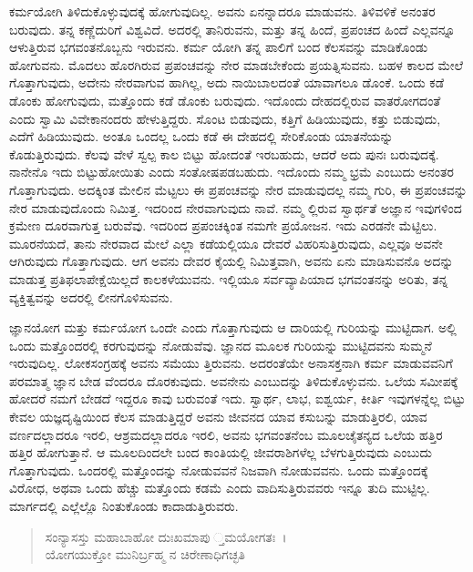 ಕರ್ಮಯೋಗಿ ತಿಳಿದುಕೊಳ್ಳುವುದಕ್ಕೆ ಹೋಗುವುದಿಲ್ಲ. ಅವನು ಏನನ್ನಾದರೂ ಮಾಡುವನು. ತಿಳಿವಳಿಕೆ ಅನಂತರ ಬರುವುದು. ತನ್ನ ಕಣ್ಣೆದುರಿಗೆ ವಿಶ್ವವಿದೆ. ಅದರಲ್ಲಿ ತಾನಿರುವನು, ಮತ್ತು ತನ್ನ ಹಿಂದೆ, ಪ್ರಪಂಚದ ಹಿಂದೆ ಎಲ್ಲವನ್ನೂ ಆಳುತ್ತಿರುವ ಭಗವಂತನೊಬ್ಬನು ಇರುವನು. ಕರ್ಮ ಯೋಗಿ ತನ್ನ ಪಾಲಿಗೆ ಬಂದ ಕೆಲಸವನ್ನು ಮಾಡಿಕೊಂಡು ಹೋಗುವನು. ಮೊದಲು ಹೊರಗಿರುವ ಪ್ರಪಂಚವನ್ನು ನೇರ ಮಾಡಬೇಕೆಂದು ಪ್ರಯತ್ನಿಸುವನು. ಬಹಳ ಕಾಲದ ಮೇಲೆ ಗೊತ್ತಾಗುವುದು, ಅದೇನು ನೇರವಾಗುವ ಹಾಗಿಲ್ಲ, ಅದು ನಾಯಿಬಾಲದಂತೆ ಯಾವಾಗಲೂ ಡೊಂಕೆ. ಒಂದು ಕಡೆ ಡೊಂಕು ಹೋಗುವುದು, ಮತ್ತೊಂದು ಕಡೆ ಡೊಂಕು ಬರುವುದು. ಇದೊಂದು ದೇಹದಲ್ಲಿರುವ ವಾತರೋಗದಂತೆ ಎಂದು ಸ್ವಾಮಿ ವಿವೇಕಾನಂದರು ಹೇಳುತ್ತಿದ್ದರು. ಸೊಂಟ ಬಿಡುವುದು, ಕತ್ತಿಗೆ ಹಿಡಿಯುವುದು, ಕತ್ತು ಬಿಡುವುದು, ಎದೆಗೆ ಹಿಡಿಯುವುದು. ಅಂತೂ ಒಂದಲ್ಲ ಒಂದು ಕಡೆ ಈ ದೇಹದಲ್ಲಿ ಸೇರಿಕೊಂಡು ಯಾತನೆಯನ್ನು ಕೊಡುತ್ತಿರುವುದು. ಕೆಲವು ವೇಳೆ ಸ್ವಲ್ಪ ಕಾಲ ಬಿಟ್ಟು ಹೋದಂತೆ ಇರಬಹುದು, ಆದರೆ ಅದು ಪುನಃ ಬರುವುದಕ್ಕೆ. ನಾನೇನೊ ಇದು ಬಿಟ್ಟುಹೋಯಿತು ಎಂದು ಸಂತೋಷಪಡಬಹುದು. ಇದೊಂದು ನಮ್ಮ ಭ್ರಮೆ ಎಂಬುದು ಅನಂತರ ಗೊತ್ತಾಗುವುದು. ಅದಕ್ಕಿಂತ ಮೇಲಿನ ಮೆಟ್ಟಲು ಈ ಪ್ರಪಂಚವನ್ನು ನೇರ ಮಾಡುವುದಲ್ಲ ನಮ್ಮ ಗುರಿ, ಈ ಪ್ರಪಂಚವನ್ನು ನೇರ ಮಾಡುವುದೊಂದು ನಿಮಿತ್ತ. ಇದರಿಂದ ನೇರವಾಗುವುದು ನಾವೆ. ನಮ್ಮ ಲ್ಲಿರುವ ಸ್ವಾರ್ಥತೆ ಅಜ್ಞಾನ ಇವುಗಳಿಂದ ಕ್ರಮೇಣ ದೂರವಾಗುತ್ತ ಬರುವೆವು. ಇದರಿಂದ ಪ್ರಪಂಚಕ್ಕಿಂತ ನಮಗೇ ಪ್ರಯೋಜನ. ಇದು ಎರಡನೇ ಮೆಟ್ಟಿಲು. ಮೂರನೆಯದೆ, ತಾನು ನೇರವಾದ ಮೇಲೆ ಎಲ್ಲಾ ಕಡೆಯಲ್ಲಿಯೂ ದೇವರೆ ವಿಹರಿಸುತ್ತಿರುವುದು, ಎಲ್ಲವೂ ಅವನೇ ಆಗಿರುವುದು ಗೊತ್ತಾಗುವುದು. ಆಗ ಅವನು ದೇವರ ಕೈಯಲ್ಲಿ ನಿಮಿತ್ತವಾಗಿ, ಅವನು ಏನು ಮಾಡಿಸುವನೊ ಅದನ್ನು ಮಾಡುತ್ತ ಪ್ರತಿಫಲಾಪೇಕ್ಷೆಯಿಲ್ಲದೆ ಕಾಲಕಳೆಯುವನು. ಇಲ್ಲಿಯೂ ಸರ್ವವ್ಯಾಪಿಯಾದ ಭಗವಂತನನ್ನು ಅರಿತು, ತನ್ನ ವ್ಯಕ್ತಿತ್ವವನ್ನು ಅದರಲ್ಲಿ ಲೀನಗೊಳಿಸುವನು.

ಜ್ಞಾನಯೋಗ ಮತ್ತು ಕರ್ಮಯೋಗ ಒಂದೇ ಎಂದು ಗೊತ್ತಾಗುವುದು ಆ ದಾರಿಯಲ್ಲಿ ಗುರಿಯನ್ನು ಮುಟ್ಟಿದಾಗ. ಅಲ್ಲಿ ಒಂದು ಮತ್ತೊಂದರಲ್ಲಿ ಕರಗುವುದನ್ನು ನೋಡುವೆವು. ಜ್ಞಾನದ ಮೂಲಕ ಗುರಿಯನ್ನು ಮುಟ್ಟಿದವನು ಸುಮ್ಮನೆ ಇರುವುದಿಲ್ಲ. ಲೋಕಸಂಗ್ರಹಕ್ಕೆ ಅವನು ಸಮೆಯು ತ್ತಿರುವನು. ಅದರಂತೆಯೇ ಅನಾಸಕ್ತನಾಗಿ ಕರ್ಮ ಮಾಡುವವನಿಗೆ ಪರಮಾತ್ಮ ಜ್ಞಾನ ಬೇಡ ವೆಂದರೂ ದೊರಕುವುದು. ಅವನೇನು ಎಂಬುದನ್ನು ತಿಳಿದುಕೊಳ್ಳುವನು. ಒಲೆಯ ಸಮೀಪಕ್ಕೆ ಹೋದರೆ ನಮಗೆ ಬೇಡದೆ ಇದ್ದರೂ ಕಾವು ಬರುವಂತೆ ಇದು. ಸ್ವಾರ್ಥ, ಲಾಭ, ಐಶ್ವರ್ಯ, ಕೀರ್ತಿ ಇವುಗಳನ್ನೆಲ್ಲ ಬಿಟ್ಟು ಕೇವಲ ಯಜ್ಞದೃಷ್ಟಿಯಿಂದ ಕೆಲಸ ಮಾಡುತ್ತಿದ್ದರೆ ಅವನು ಜೀವನದ ಯಾವ ಕಸುಬನ್ನು ಮಾಡುತ್ತಿರಲಿ, ಯಾವ ವರ್ಣದಲ್ಲಾದರೂ ಇರಲಿ, ಆಶ್ರಮದಲ್ಲಾದರೂ ಇರಲಿ, ಅವನು ಭಗವಂತನೆಂಬ ಮೂಲಚೈತನ್ಯದ ಒಲೆಯ ಹತ್ತಿರ ಹತ್ತಿರ ಹೋಗುತ್ತಾನೆ. ಆ ಮೂಲದಿಂದಲೇ ಬಂದ ಕಾಂತಿಯಲ್ಲಿ ಜೀವರಾಶಿಗಳೆಲ್ಲ ಬೆಳಗುತ್ತಿರುವುದು ಎಂಬುದು ಗೊತ್ತಾಗುವುದು. ಒಂದರಲ್ಲಿ ಮತ್ತೊಂದನ್ನು ನೋಡುವವನೆ ನಿಜವಾಗಿ ನೋಡುವವನು. ಒಂದು ಮತ್ತೊಂದಕ್ಕೆ ವಿರೋಧ, ಅಥವಾ ಒಂದು ಹೆಚ್ಚು ಮತ್ತೊಂದು ಕಡಮೆ ಎಂದು ವಾದಿಸುತ್ತಿರುವವರು ಇನ್ನೂ ತುದಿ ಮುಟ್ಟಿಲ್ಲ. ಮಾರ್ಗದಲ್ಲಿ ಎಲ್ಲೆಲ್ಲೊ ನಿಂತುಕೊಂಡು ಕಾದಾಡುತ್ತಿರುವರು.

\begin{verse}
ಸಂನ್ಯಾಸಸ್ತು ಮಹಾಬಾಹೋ ದುಃಖಮಾಪು ್ತಮಯೋಗತಃ~।\\ಯೋಗಯುಕ್ತೋ ಮುನಿರ್ಬ್ರಹ್ಮ ನ ಚಿರೇಣಾಧಿಗಚ್ಛತಿ 
\end{verse}

